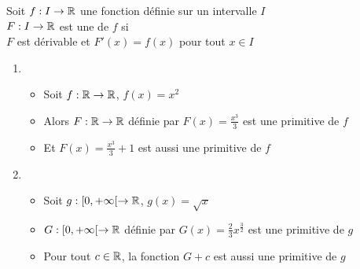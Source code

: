 \begin{frame}

\begin{mydefinition}
Soit $f:I \to \mathbb{R}$ une fonction définie sur un intervalle $I$ \\
$F : I \to \mathbb{R}$ est une  de $f$ si \\
$F$ est dérivable et $F'(x)=f(x)$ pour tout $x \in I$  
\end{mydefinition}

\pause

\begin{exemple}
\begin{enumerate}
\item 
   \begin{itemize}
     \item Soit $f: \mathbb{R} \to \mathbb{R}$, $f(x) = x^2$
\pause
     \item Alors $F: \mathbb{R} \to \mathbb{R}$ définie par $F(x) = \frac{x^3}{3}$ est une primitive de $f$
\pause
     \item Et $F(x)= \frac{x^3}{3}+1$ est aussi une primitive de $f$
   \end{itemize}
\pause
\item 
   \begin{itemize}
     \item Soit $g : [0,+\infty[ \to \mathbb{R}$, $g(x)=\sqrt x$
\pause
     \item $G : [0,+\infty[ \to\mathbb{R}$ définie par $G(x)=\frac{2}{3} x^{\frac{3}{2}}$
est une primitive de $g$
\pause
     \item Pour tout $c\in \mathbb{R}$, la fonction $G+c$ est aussi une primitive de $g$
   \end{itemize}
\end{enumerate}  
\end{exemple}

\end{frame}



